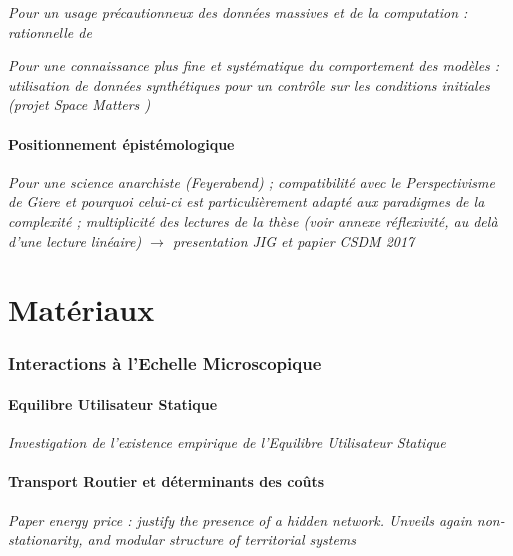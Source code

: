 \textit{Pour un usage précautionneux des données massives et de la computation : rationnelle de~\cite{raimbault2016cautious}}

\textit{Pour une connaissance plus fine et systématique du comportement des modèles : utilisation de données synthétiques pour un contrôle sur les conditions initiales (projet Space Matters \cite{cottineau2015revisiting})}



\subsection{Positionnement épistémologique}

\textit{Pour une science anarchiste (Feyerabend) ; compatibilité avec le Perspectivisme de Giere et pourquoi celui-ci est particulièrement adapté aux paradigmes de la complexité ; multiplicité des lectures de la thèse (voir annexe réflexivité, au delà d'une lecture linéaire) $\rightarrow$ presentation JIG et papier CSDM 2017}














\part{Matériaux}

\section{Interactions à l'Echelle Microscopique}

\subsection{Equilibre Utilisateur Statique}

\textit{Investigation de l'existence empirique de l'Equilibre Utilisateur Statique~\cite{raimbault2016investigating}}


\subsection{Transport Routier et déterminants des coûts}

\textit{Paper energy price : justify the presence of a hidden network. Unveils again non-stationarity, and modular structure of territorial systems}



